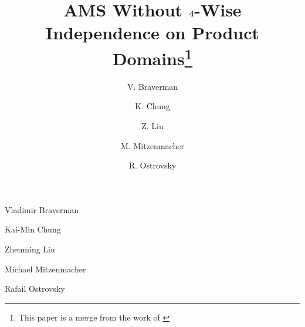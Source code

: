 \def\draft{0}  \documentclass[proceedings]{stacs}
\theoremstyle{plain}\newtheorem{satz}[thm]{Satz}
\theoremstyle{definition}\newtheorem{crucial}[thm]{Crucial Definition}
\begin{document}
\title[AMS Without $\bf{4}$-Wise Independence on Product Domains]{AMS Without $\bf{4}$-Wise Independence on Product Domains\footnote{This paper is a merge from the  work of \cite{BO01, BO02, CLM}}}

\author[lab1]{V. Braverman}{Vladimir Braverman}
\address[lab1]{University of California Los Angeles. Supported in part by NSF grants 0716835, 0716389, 0830803, 0916574
and Lockheed Martin Corporation.}      

\author[lab2]{K. Chung}{Kai-Min Chung}
\address[lab2]{Harvard School of Engineering and Applied Sciences. Supported by US-Israel BSF grant 2006060 and NSF grant CNS-0831289.}	    

\author[lab3]{Z. Liu}{Zhenming Liu}
\address[lab3]{Harvard School of Engineering and Applied Sciences. Supported in part by NSF grant CNS-0721491. The work was finished during an internship in Microsoft Research Asia.}
    

\author[lab4]{M. Mitzenmacher}{Michael Mitzenmacher}
\address[lab4]{Harvard School of Engineering and Applied Sciences. Supported in part by NSF grant CNS-0721491 and research grants from Yahoo!, Google, and Cisco.}
    

\author[lab5]{R. Ostrovsky}{Rafail Ostrovsky}
\address[lab5]{University of California Los Angeles. Supported in part by IBM Faculty Award, Lockheed-Martin Corporation
Research Award, Xerox Innovation Group Award, the Okawa Foundation Award,
Intel, Teradata, NSF grants 0716835, 0716389, 0830803, 0916574 and U.C.
MICRO grant.}      



\end{document}
